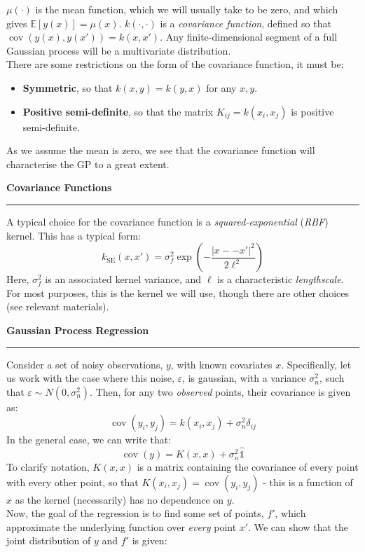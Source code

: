 \documentclass[12pt]{article}
\newcommand{\minisection}[1]{
    \par\vspace{0.25cm}
    \textbf{#1}\par
    \vspace{0.1cm}
    \hrule
    \vspace{0.25cm}
}
\DeclareMathOperator{\cov}{cov}
\newcommand{\idop}{\hat{\mathds{1}}}
\begin{document}
    $\mu(\cdot)$ is the mean function, which we will usually take to be zero, and which gives $\mathbb E[y(x)] = \mu(x)$. $k(\cdot,\cdot)$ is a \textit{covariance function}, defined so that $\cov(y(x),y(x')) = k(x,x')$. Any finite-dimensional segment of a full Gaussian process will be a multivariate distribution.\\
    There are some restrictions on the form of the covariance function, it must be:
    \begin{itemize}
        \item \textbf{Symmetric}, so that $k(x,y) = k(y,x)$ for any $x,y$.
        \item \textbf{Positive semi-definite}, so that the matrix $K_{ij} = k(x_i,x_j)$ is positive semi-definite.
    \end{itemize}
    As we assume the mean is zero, we see that the covariance function will characterise the GP to a great extent.
    \minisection{Covariance Functions}
    A typical choice for the covariance function is a \textit{squared-exponential} (\textit{RBF}) kernel. This has a typical form:
    \begin{equation*}
        k_{\text{SE}}(x,x') = \sigma_f^2\exp\left(-\frac{\left| x--x'\right|^2}{2\ell ^2}\right)
    \end{equation*}
    Here, $\sigma_f^2$ is an associated kernel variance, and $\ell$ is a characteristic \textit{lengthscale}. For most purposes, this is the kernel we will use, though there are other choices (see relevant materials).
    \minisection{Gaussian Process Regression}
    Consider a set of noisy observations, $y$, with known covariates $x$. Specifically, let us work with the case where this noise, $\varepsilon$, is gaussian, with a variance $\sigma_n^2$, such that $\varepsilon\sim N(0,\sigma_n^2)$. Then, for any two \textit{observed} points, their covariance is given as:
    \begin{equation*}
        \cov(y_i,y_j) = k(x_i,x_j) + \sigma_n^2\delta_{ij}
    \end{equation*}
    In the general case, we can write that:
    \begin{equation*}
        \cov(y) = K(x,x)  + \sigma_n^2\idop
    \end{equation*}
    To clarify notation, $K(x,x)$ is a matrix containing the covariance of every point with every other point, so that $K(x_i,x_j) = \cov(y_i,y_j)$ - this is a function of $x$ as the kernel (necessarily) has no dependence on $y$.\\
    Now, the goal of the regression is to find some set of points, $f'$, which approximate the underlying function over \textit{every} point $x'$. We can show that the joint distribution of $y$ and $f'$ is given:
\end{document}
